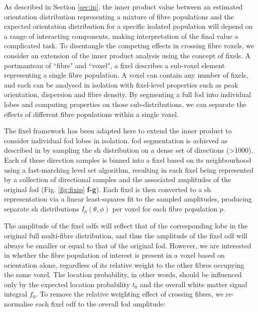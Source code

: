 As described in Section \ref{sec:ip}, the inner product value between an estimated orientation distribution representing a mixture of fibre populations and the expected orientation distribution for a specific isolated population will depend on a range of interacting components, making interpretation of the final value a complicated task.
To disentangle the competing effects in crossing fibre voxels, we consider an extension of the inner product analysis using the concept of fixels.
A portmanteau of ``fibre" and ``voxel", a fixel describes a sub-voxel element representing a single fibre population.\autocite{Raffelt2015,Raffelt2017}
A voxel can contain any number of fixels, and each can be analysed in isolation with fixel-level properties such as peak orientation, dispersion and fibre density.
By segmenting a full \gls{fod} into individual lobes and computing properties on those sub-distributions, we can separate the effects of different fibre populations within a single voxel.

The fixel framework has been adapted here to extend the inner product to consider individual \gls{fod} lobes in isolation.
\gls{fod} segmentation is achieved as described in \textcite{Smith2013} by sampling the \gls{sh} distribution on a dense set of directions (\textgreater 1000).
Each of these direction samples is binned into a fixel based on its neighbourhood using a fast-marching level set algorithm, resulting in each fixel being represented by a collection of directional samples and the associated amplitudes of the original \gls{fod} (Fig. \ref{fig:fixip} \textbf{f-g}).
Each fixel is then converted to a \gls{sh} representation via a linear least-squares fit to the sampled amplitudes, producing separate \gls{sh} distributions $I_p(\theta, \phi)$ per voxel for each fibre population $p$.

The amplitude of the fixel \glspl{odf} will reflect that of the corresponding lobe in the original full multi-fibre distribution, and thus the amplitude of the fixel \gls{odf} will always be smaller or equal to that of the original \gls{fod}.
However, we are interested in whether the fibre population of interest is present in a voxel based on orientation alone, regardless of its relative weight to the other fibres occupying the same voxel.
The location probability, in other words, should be influenced only by the expected location probability $t_0$ and the overall white matter signal integral $f_0$.
To remove the relative weighting effect of crossing fibres, we re-normalise each fixel \gls{odf} to the overall \gls{fod} amplitude:

